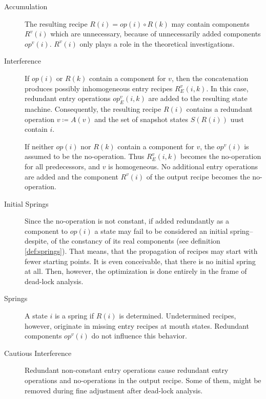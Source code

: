 \documentclass[12pt,a4paper]{scrartcl}
\begin{document}
\begin{description}
\item [Accumulation]

    The resulting recipe $R(i) = op(i)\circ R(k)$ may contain components
    $R^v(i)$ which are unnecessary, because of unnecessarily added components
    $op^v(i)$. $R^v(i)$ only plays a role in the theoretical investigations.

\item [Interference]

    If $op(i)$ or $R(k)$ contain a component for $v$, then the concatenation
    produces possibly inhomogeneous entry recipes $R^v_E(i,k)$.  In this case,
    redundant entry operations $op_E^v(i,k)$ are added to the resulting state
    machine. Consequently, the resulting recipe $R(i)$ contains a redundant
    operation $v\coloneqq A(v)$ and the set of snapshot states $S(R(i))$ uust
    contain $i$.

    If neither $op(i)$ nor $R(k)$ contain a component for $v$, the $op^v(i)$ is
    assumed to be the no-operation. Thus $R_E^v(i,k)$ becomes the no-operation
    for all predecessors, and $v$ is homogeneous. No additional entry
    operations are added and the component $R^v(i)$ of the output recipe
    becomes the no-operation.

\item [Initial Springs]

    Since the no-operation is not constant, if added redundantly as a component
    to $op(i)$ a state may fail to be considered an initial spring--despite, of
    the constancy of its real components (see definition \ref{def:springs}).
    That means, that the propagation of recipes may start with fewer starting
    points. It is even conceivable, that there is no initial spring at all.
    Then, however, the optimization is done entirely in the frame of dead-lock
    analysis.

\item [Springs]

    A state $i$ is a spring if $R(i)$ is determined. Undetermined recipes,
    however, originate in missing entry recipes at mouth states. Redundant
    components $op^v(i)$ do not influence this behavior.

\item [Cautious Interference]

    Redundant non-constant entry operations cause redundant entry operations
    and no-operations in the output recipe. Some of them, might be removed
    during fine adjustment after dead-lock analysis.

\end{description}
\end{document}

